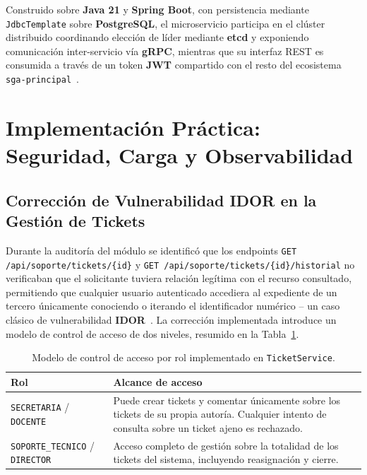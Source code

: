 ﻿\documentclass[11pt,a4paper]{article}
\begin{document}
Construido sobre \textbf{Java 21} y \textbf{Spring Boot}, con persistencia mediante \texttt{JdbcTemplate} sobre \textbf{PostgreSQL}, el microservicio participa en el cl\'uster distribuido coordinando elecci\'on de l\'ider mediante \textbf{etcd} y exponiendo comunicaci\'on inter-servicio v\'ia \textbf{gRPC}, mientras que su interfaz REST es consumida a trav\'es de un token \textbf{JWT} compartido con el resto del ecosistema \texttt{sga-principal}~\cite{jones2015jwt}.

\section{Implementaci\'on Pr\'actica: Seguridad, Carga y Observabilidad}

\subsection{Correcci\'on de Vulnerabilidad IDOR en la Gesti\'on de Tickets}
Durante la auditor\'ia del m\'odulo se identific\'o que los endpoints \texttt{GET /api/soporte/tickets/\{id\}} y \texttt{GET /api/soporte/tickets/\{id\}/historial} no verificaban que el solicitante tuviera relaci\'on leg\'itima con el recurso consultado, permitiendo que cualquier usuario autenticado accediera al expediente de un tercero \'unicamente conociendo o iterando el identificador num\'erico -- un caso cl\'asico de vulnerabilidad \textbf{IDOR}~\cite{fielding2000architectural}. La correcci\'on implementada introduce un modelo de control de acceso de dos niveles, resumido en la Tabla~\ref{tab:rbac}.

\begin{table}[H]
\centering
\caption{Modelo de control de acceso por rol implementado en \texttt{TicketService}.}
\label{tab:rbac}
\begin{tabularx}{\textwidth}{@{}l X@{}}
\toprule
\textbf{Rol} & \textbf{Alcance de acceso} \\
\midrule
\texttt{SECRETARIA} / \texttt{DOCENTE} & Puede crear tickets y comentar \'unicamente sobre los tickets de su propia autor\'ia. Cualquier intento de consulta sobre un ticket ajeno es rechazado. \\
\texttt{SOPORTE\_TECNICO} / \texttt{DIRECTOR} & Acceso completo de gesti\'on sobre la totalidad de los tickets del sistema, incluyendo reasignaci\'on y cierre. \\
\bottomrule
\end{tabularx}
\end{table}
\end{document}
